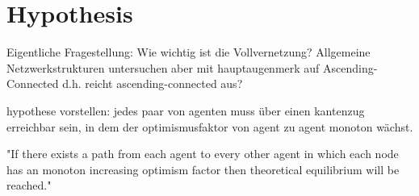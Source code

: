 \documentclass[Bachelorarbeit.tex]{subfiles}
\begin{document}
\chapter{Hypothesis}
Eigentliche Fragestellung: Wie wichtig ist die Vollvernetzung?
	Allgemeine Netzwerkstrukturen untersuchen aber mit hauptaugenmerk auf Ascending-Connected d.h. reicht ascending-connected aus?

hypothese vorstellen: jedes paar von agenten muss über einen kantenzug erreichbar sein, in dem der optimismusfaktor von agent zu agent monoton wächst.


"If there exists a path from each agent to every other agent in which each node has an monoton increasing optimism factor then theoretical equilibrium will be reached."
\end{document}
